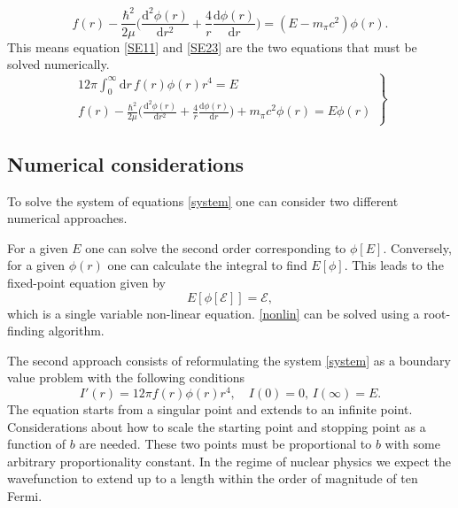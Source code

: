 \begin{equation} \label{SE23}
    f(r) -\frac{\hbar^2}{2\mu}\Big(\frac{\text{d}^2 \phi(r)}{\text{d}r^2}+\frac{4}{r}\frac{\text{d}\phi(r)}{\text{d}r}\Big) = (E-m_\pi c^2)\phi(r).
\end{equation}
This means equation \eqref{SE11} and \eqref{SE23} are the two equations that must be solved numerically.
\begin{equation} \label{system}
 \left.
    \begin{array}{ll}
            12\pi \int_0^\infty  \text{d}r \, f(r) \phi(r) r^4  = E \\
            f(r) -\frac{\hbar^2}{2\mu}\Big(\frac{\text{d}^2 \phi(r)}{\text{d}r^2}+\frac{4}{r}\frac{\text{d}\phi(r)}{\text{d}r}\Big)+m_\pi c^2 \phi(r) = E\phi(r)
    \end{array}
\right \} 
\end{equation}
\subsection{Numerical considerations}
To solve the system of equations \eqref{system} one can consider two different numerical approaches. 

For a given $E$ one can solve the second order corresponding to $\phi[E]$. Conversely, for a given $\phi(r)$ one can calculate the integral to find $E[\phi]$. This leads to the fixed-point equation given by
\begin{equation} \label{nonlin}
    E[\phi[\mathcal{E}]] = \mathcal{E},
\end{equation}
which is a single variable non-linear equation. \eqref{nonlin} can be solved using a root-finding algorithm.

The second approach consists of reformulating the system \eqref{system} as a boundary value problem with the following conditions
\begin{equation}
    I'(r) = 12\pi f(r)\phi(r)r^4, \quad I(0)=0, \, I(\infty)=E.
\end{equation}
The equation starts from a singular point and extends to an infinite point. Considerations about how to scale the starting point and stopping point as a function of $b$ are needed. These two points must be proportional to $b$ with some arbitrary proportionality constant. In the regime of nuclear physics we expect the wavefunction to extend up to a length within the order of magnitude of ten Fermi. 

